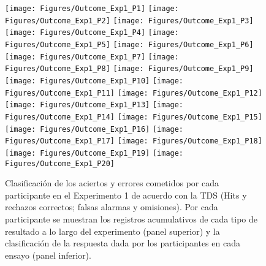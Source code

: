 \begin{figure}[th]
\centering
\texttt{[image: Figures/Outcome\_Exp1\_P1]} \texttt{[image: Figures/Outcome\_Exp1\_P2]} \texttt{[image: Figures/Outcome\_Exp1\_P3]}
\texttt{[image: Figures/Outcome\_Exp1\_P4]} \texttt{[image: Figures/Outcome\_Exp1\_P5]} \texttt{[image: Figures/Outcome\_Exp1\_P6]}
\texttt{[image: Figures/Outcome\_Exp1\_P7]} \texttt{[image: Figures/Outcome\_Exp1\_P8]} \texttt{[image: Figures/Outcome\_Exp1\_P9]}
\texttt{[image: Figures/Outcome\_Exp1\_P10]} \texttt{[image: Figures/Outcome\_Exp1\_P11]} \texttt{[image: Figures/Outcome\_Exp1\_P12]}
\texttt{[image: Figures/Outcome\_Exp1\_P13]} \texttt{[image: Figures/Outcome\_Exp1\_P14]} \texttt{[image: Figures/Outcome\_Exp1\_P15]}
\texttt{[image: Figures/Outcome\_Exp1\_P16]} \texttt{[image: Figures/Outcome\_Exp1\_P17]} \texttt{[image: Figures/Outcome\_Exp1\_P18]}
\texttt{[image: Figures/Outcome\_Exp1\_P19]} \texttt{[image: Figures/Outcome\_Exp1\_P20]} 
\caption[Resultados obtenidos por ensayo; Experimento 1]{Clasificación de los aciertos y errores cometidos por cada participante en el Experimento 1 de acuerdo con la TDS (Hits y rechazos correctos; falsas alarmas y omisiones). Por cada participante se muestran los registros acumulativos de cada tipo de resultado a lo largo del experimento (panel superior) y la clasificación de la respuesta dada por los participantes en cada ensayo (panel inferior).}
\label{fig:Outcome_E1}
\end{figure}


